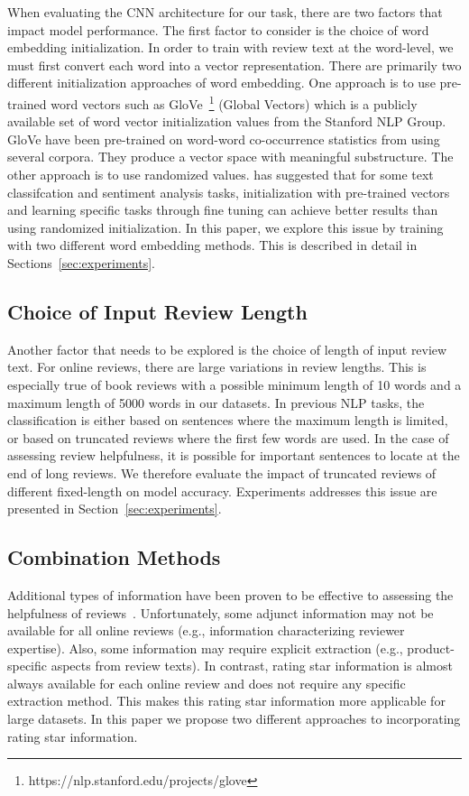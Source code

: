 \documentclass[conference,compsoc]{IEEEtran}
\begin{document}
When evaluating the CNN architecture for our task, there are two factors that impact model performance. The first factor to consider is the choice of word embedding initialization. In order to train with review text at the word-level, we must first convert each word into a vector representation. There are primarily two different initialization approaches of word embedding. One approach is to use pre-trained word vectors such as GloVe~\footnote{https://nlp.stanford.edu/projects/glove} (Global Vectors) which is a publicly available set of word vector initialization values from the Stanford NLP Group. GloVe have been pre-trained on word-word co-occurrence statistics from using several corpora. They produce a vector space with meaningful substructure. The other approach is to use randomized values. \cite{Kim14f} has suggested that for some text classifcation and sentiment analysis tasks, initialization with pre-trained vectors and learning specific tasks through fine tuning can achieve better results than using randomized initialization. In this paper, we explore this issue by training with two different word embedding methods. This is described in detail in Sections~\ref{sec:experiments}.

\subsection{Choice of Input Review Length}
Another factor that needs to be explored is the choice of length of input review text. For online reviews, there are large variations in review lengths. This is especially true of book reviews with a possible minimum length of 10 words and a maximum length of 5000 words in our datasets. In previous NLP tasks, the classification is either based on sentences where the maximum length is limited, or based on truncated reviews where the first few words are used. In the case of assessing review helpfulness, it is possible for important sentences to locate at the end of long reviews. We therefore evaluate the impact of truncated reviews of different fixed-length on model accuracy. Experiments addresses this issue are presented in Section~\ref{sec:experiments}.

\subsection{Combination Methods}
Additional types of information have been proven to be effective to assessing the helpfulness of reviews~\cite{Mudambi_2010}. Unfortunately, some adjunct information may not be available for all online reviews (e.g., information characterizing reviewer expertise). Also, some information may require explicit extraction (e.g., product-specific aspects from review texts). In contrast, rating star information is almost always available for each online review and does not require any specific extraction method. This makes this rating star information more applicable for large datasets. In this paper we propose two different approaches to incorporating rating star information.
\end{document}
